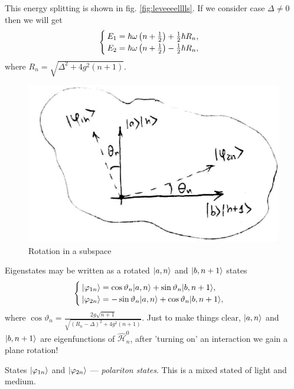 This energy splitting is shown in fig. \ref{fig:leveeeelllls}. If we consider case $\Delta \neq 0$ then we will get
\begin{equation}
	\begin{cases}
	E_1 = \hbar \omega \left( n + \frac{1}{2} \right) + \frac{1}{2} \hbar R_n, \\
	E_2 = \hbar \omega \left( n + \frac{1}{2} \right) - \frac{1}{2} \hbar R_n,
	\end{cases}
	\label{eq:system57}
\end{equation}
where $R_n = \sqrt{\Delta^2 + 4g^2 (n+1)}$.
\begin{figure}
	\centering
	\includegraphics[width=0.65\linewidth]{fig/L6/rotation}
	\caption{Rotation in a subspace}
	\label{fig:rotation}
\end{figure}

Eigenstates may be written as a rotated $\lvert a,n\rangle$ and $\lvert b,n+1\rangle$ states
\begin{equation}
	\begin{cases}
		\lvert\varphi_{1n}\rangle = \cos \vartheta_n \lvert a, n\rangle + \sin \vartheta_n \lvert b ,n +1\rangle, \\
		\lvert\varphi_{2n}\rangle = -\sin \vartheta_n \lvert a, n\rangle + \cos \vartheta_n \lvert b ,n +1\rangle,
	\end{cases}
\end{equation}
where $\cos \vartheta_n = \frac{2 g \sqrt{n+1}}{\sqrt{(R_n - \Delta)^2 + 4 g^2 (n+1)}}$. Just to make things clear, $\lvert a,n\rangle$ and $\lvert b,n+1\rangle$ are eigenfunctions of $\hat{\mathcal{H}}^0_{n}$, after 'turning on' an interaction we gain a plane rotation!


States $\lvert\varphi_{1n}\rangle$ and $\lvert\varphi_{2n}\rangle$ --- \textit{polariton states}. This is a mixed stated of light and medium. 


